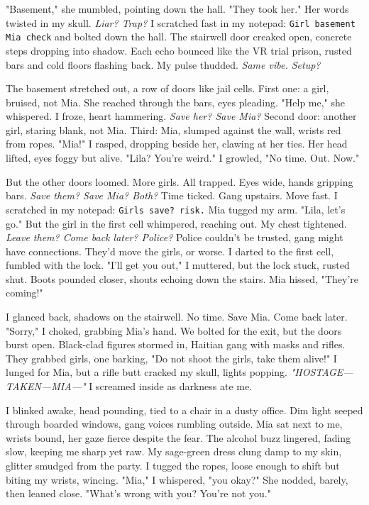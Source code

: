 \documentclass[12pt]{article}
\newcommand{\note}[1]{\texttt{#1}}
\begin{document}
{"Basement," she mumbled, pointing down the hall. "They took her." Her words twisted in my skull. \textit{Liar? Trap?} I scratched fast in my notepad: \note{Girl basement Mia check} and bolted down the hall. The stairwell door creaked open, concrete steps dropping into shadow. Each echo bounced like the VR trial prison, rusted bars and cold floors flashing back. My pulse thudded. \textit{Same vibe. Setup?}

The basement stretched out, a row of doors like jail cells. First one: a girl, bruised, not \textnormal{Mia}. She reached through the bars, eyes pleading. "Help me," she whispered. I froze, heart hammering. \textit{Save her? Save \textnormal{Mia}?} Second door: another girl, staring blank, not \textnormal{Mia}. Third: \textnormal{Mia}, slumped against the wall, wrists red from ropes. "\textnormal{Mia}!" I rasped, dropping beside her, clawing at her ties. Her head lifted, eyes foggy but alive. "\textnormal{Lila}? You’re weird." I growled, "No time. Out. Now."

But the other doors loomed. More girls. All trapped. Eyes wide, hands gripping bars. \textit{Save them? Save \textnormal{Mia}? Both?} Time ticked. Gang upstairs. Move fast. I scratched in my notepad: \note{Girls save? risk.} \textnormal{Mia} tugged my arm. "\textnormal{Lila}, let’s go." But the girl in the first cell whimpered, reaching out. My chest tightened. \textit{Leave them? Come back later? Police?} Police couldn’t be trusted, gang might have connections. They’d move the girls, or worse. I darted to the first cell, fumbled with the lock. "I’ll get you out," I muttered, but the lock stuck, rusted shut. Boots pounded closer, shouts echoing down the stairs. \textnormal{Mia} hissed, "They’re coming!"

I glanced back, shadows on the stairwell. No time. Save \textnormal{Mia}. Come back later. "Sorry," I choked, grabbing \textnormal{Mia}’s hand. We bolted for the exit, but the doors burst open. Black-clad figures stormed in, Haitian gang with masks and rifles. They grabbed girls, one barking, "Do not shoot the girls, take them alive!" I lunged for \textnormal{Mia}, but a rifle butt cracked my skull, lights popping. \textit{"HOSTAGE—TAKEN—MIA—"} I screamed inside as darkness ate me.

I blinked awake, head pounding, tied to a chair in a dusty office. Dim light seeped through boarded windows, gang voices rumbling outside. \textnormal{Mia} sat next to me, wrists bound, her gaze fierce despite the fear. The alcohol buzz lingered, fading slow, keeping me sharp yet raw. My sage-green dress clung damp to my skin, glitter smudged from the party. I tugged the ropes, loose enough to shift but biting my wrists, wincing. "\textnormal{Mia}," I whispered, "you okay?" She nodded, barely, then leaned close. "What’s wrong with you? You’re not you."

}
\end{document}

